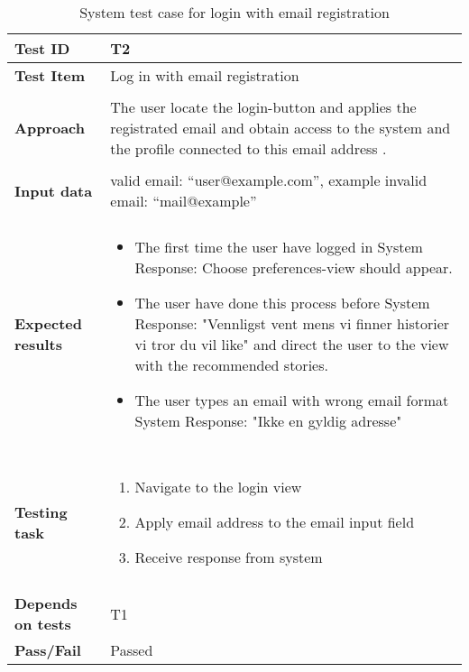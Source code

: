 	
\begin{table}[H]
	\centering
	\caption{System test case for login with email registration}
	\begin{adjustbox}{center}
	\begin{tabular}{ | l | l  |}
		\hline
		\textbf{Test ID} & T2  \\ \hline 
		\textbf{Test Item} & Log in with email registration \\ \hline&\\[-2ex]
		\textbf{Approach} & \begin{minipage}{5in}The user locate the login-button and applies the registrated email and obtain access to the system and the profile connected to this email address . \end{minipage}\\ &\\[-2ex]\hline
		\textbf{Input data} &  valid email: “user@example.com”, \newline example invalid email: “mail@example”\\ \hline&\\[-2ex]
		\textbf{Expected results} & \begin{minipage}{5in}
			\begin{itemize}[noitemsep]
				\item The first time the user have logged in \newline System Response:  Choose preferences-view should appear.
				\item The user have done this process before \newline System Response: "Vennligst vent mens vi finner historier vi tror du vil like" and direct the user to the view with the recommended stories.
				\item The user types an email with wrong email format \newline System Response: "Ikke en gyldig adresse" 
				
			\end{itemize} \end{minipage}
			\\ &\\[-2ex]\hline&\\[-2ex]
			\textbf{Testing task} & \begin{minipage}{5in}
				\begin{enumerate}[noitemsep]
					\item Navigate to the login view
					\item Apply email address to the email input field
					\item Receive response from system
				\end{enumerate}\end{minipage}
				\\ &\\[-2ex]\hline
				\textbf{Depends on tests} & T1 \\ \hline					
				\textbf{Pass/Fail} & Passed \\\hline
	\end{tabular}
	\end{adjustbox}
	\label{Tab_systemtest2}
\end{table}
			
